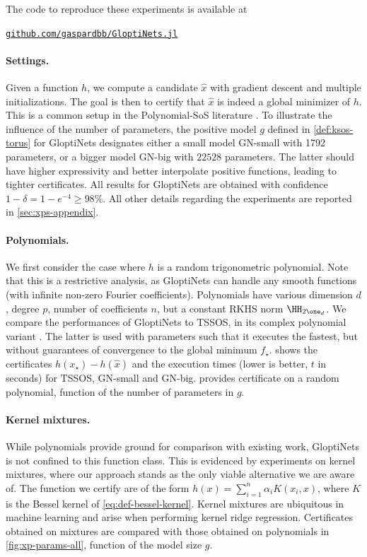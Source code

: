 \documentclass{article}
\begin{document}
The code to reproduce these experiments is available at

  {\centering
    \href{https://github.com/gaspardbb/GloptiNets.jl}{\texttt{github.com/gaspardbb/GloptiNets.jl}}
  }


\paragraph{Settings.}
Given a function $h$, we compute a candidate $\hat{x}$ with gradient descent and multiple initializations. The goal is then to certify that $\hat{x}$ is indeed a global minimizer of $h$. This is a common setup in the Polynomial-SoS literature \cite{wangExploitingSparsityComplex2022}.
To illustrate the influence of the number of parameters, the positive model $g$ defined in \cref{def:ksos-torus} for GloptiNets designates either a small model GN-small with 1792 parameters, or a bigger model GN-big with $22528$ parameters. The latter should have higher expressivity and better interpolate positive functions, leading to tighter certificates.
All results for GloptiNets are obtained with confidence $1 - \delta = 1 - e^{-4} \geq 98\%$.
All other details regarding the experiments are reported in \cref{sec:xps-appendix}.

\paragraph{Polynomials.}
We first consider the case where $h$ is a random trigonometric polynomial.
Note that this is a restrictive analysis, as GloptiNets can handle any smooth functions (\ie with infinite non-zero Fourier coefficients). Polynomials have various dimension $d$, degree $p$, number of coefficients $n$, but a constant RKHS norm $\HH_{2\one_d}$.
We compare the performances of GloptiNets to TSSOS, in its complex polynomial variant \cite{wangExploitingSparsityComplex2022}. The latter is used with parameters such that it executes the fastest, but without guarantees of convergence to the global minimum $f_\star$.  shows the certificates $h(x_\star) - h(\hat{x})$ and the execution times (lower is better, $t$ in seconds) for TSSOS, GN-small and GN-big.  provides certificate on a random polynomial, function of the number of parameters in $g$.

\paragraph{Kernel mixtures.}
While polynomials provide ground for comparison with existing work, GloptiNets is not confined to this function class. This is evidenced by experiments on kernel mixtures, where our approach stands as the only viable alternative we are aware of.
The function we certify are of the form $h(x) = \sum_{i=1}^n \alpha_i K(x_i, x)$, where $K$ is the Bessel kernel of \cref{eq:def-bessel-kernel}. Kernel mixtures are ubiquitous in machine learning and arise \eg when performing kernel ridge regression.
Certificates obtained on mixtures are compared with those obtained on polynomials in \cref{fig:xp-params-all}, function of the model size $g$.
\end{document}
